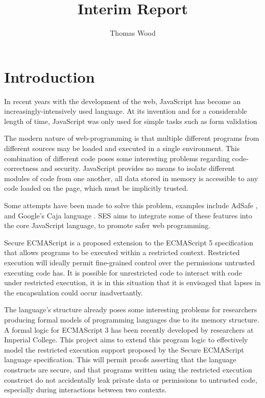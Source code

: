 \documentclass[a4paper]{report}
\title{Interim Report}
\author{Thomas Wood}
\begin{document}
\maketitle

\chapter{Introduction}
  In recent years with the development of the web, JavaScript has become an
  increasingly-intensively used language. At its invention and for a
  considerable length of time, JavaScript was only used for simple tasks such as
  form validation
  
  The modern nature of web-programming
  is that multiple different programs from different sources may be loaded and
  executed in a single environment. This combination of different code poses
  some interesting problems regarding code-correctness and security. JavaScript
  provides no means to isolate different modules of code from one another, all
  data stored in memory is accessible to any code loaded on the page, which must
  be implicitly trusted.

  Some attempts have been made to solve this problem, examples include AdSafe
  \cite{AdSafe}, and Google's Caja language \cite{miller2008caja}. SES aims to
  integrate some of these features into the core JavaScript language, to promote
  safer web programming.

  Secure ECMAScript is a proposed extension to the ECMAScript 5 specification
  that allows programs to be executed within a restricted context. Restricted
  execution will ideally permit fine-grained control over the permissions
  untrusted executing code has. It is possible for unrestricted code to interact
  with code under restricted execution, it is in this situation that it is
  envisaged that lapses in the encapsulation could occur inadvertantly.

  The language's structure already poses some interesting problems for
  researchers producing formal models of programming languages due to its memory
  structure.  A formal logic for ECMAScript 3 has been recently developed by
  researchers at Imperial College. This project aims to extend this program
  logic to effectively model the restricted execution support proposed by the
  Secure ECMAScript language specification. This will permit proofs asserting
  that the language constructs are secure, and that programs written using the
  restricted execution construct do not accidentally leak private data or
  permissions to untrusted code, especially during interactions between two
  contexts.
\end{document}
